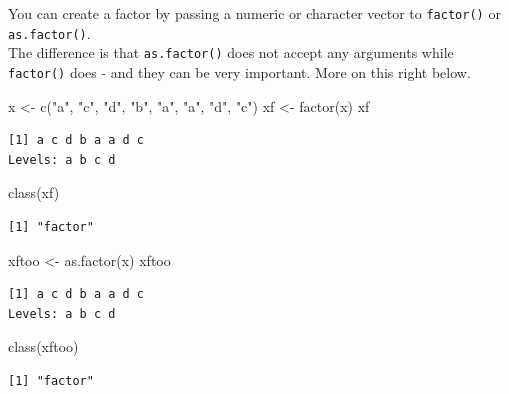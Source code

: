 \documentclass[
]{book}
\newenvironment{Shaded}{\begin{snugshade}}{\end{snugshade}}
\newcommand{\FunctionTok}[1]{\textcolor[rgb]{0.00,0.00,0.00}{#1}}
\newcommand{\NormalTok}[1]{#1}
\newcommand{\OtherTok}[1]{\textcolor[rgb]{0.56,0.35,0.01}{#1}}
\newcommand{\StringTok}[1]{\textcolor[rgb]{0.31,0.60,0.02}{#1}}
\begin{document}
You can create a factor by passing a numeric or character vector to \texttt{factor()} or \texttt{as.factor()}.\\
The difference is that \texttt{as.factor()} does not accept any arguments while \texttt{factor()} does - and they can be very important. More on this right below.

\begin{Shaded}
\begin{Highlighting}[]
\NormalTok{x }\OtherTok{\textless{}{-}} \FunctionTok{c}\NormalTok{(}\StringTok{"a"}\NormalTok{, }\StringTok{"c"}\NormalTok{, }\StringTok{"d"}\NormalTok{, }\StringTok{"b"}\NormalTok{, }\StringTok{"a"}\NormalTok{, }\StringTok{"a"}\NormalTok{, }\StringTok{"d"}\NormalTok{, }\StringTok{"c"}\NormalTok{)}
\NormalTok{xf }\OtherTok{\textless{}{-}} \FunctionTok{factor}\NormalTok{(x)}
\NormalTok{xf}
\end{Highlighting}
\end{Shaded}

\begin{verbatim}
[1] a c d b a a d c
Levels: a b c d
\end{verbatim}

\begin{Shaded}
\begin{Highlighting}[]
\FunctionTok{class}\NormalTok{(xf)}
\end{Highlighting}
\end{Shaded}

\begin{verbatim}
[1] "factor"
\end{verbatim}

\begin{Shaded}
\begin{Highlighting}[]
\NormalTok{xftoo }\OtherTok{\textless{}{-}} \FunctionTok{as.factor}\NormalTok{(x)}
\NormalTok{xftoo}
\end{Highlighting}
\end{Shaded}

\begin{verbatim}
[1] a c d b a a d c
Levels: a b c d
\end{verbatim}

\begin{Shaded}
\begin{Highlighting}[]
\FunctionTok{class}\NormalTok{(xftoo)}
\end{Highlighting}
\end{Shaded}

\begin{verbatim}
[1] "factor"
\end{verbatim}
\end{document}
